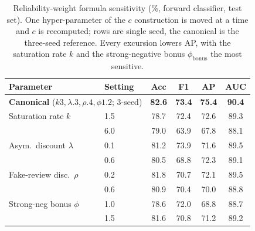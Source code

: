 \documentclass[11pt]{article}
\begin{document}
\begin{table}[h]
\centering\footnotesize
\setlength{\tabcolsep}{6pt}
\begin{tabular}{llcccc}
\toprule
\textbf{Parameter} & \textbf{Setting} & \textbf{Acc} & \textbf{F1} & \textbf{AP} & \textbf{AUC} \\
\midrule
\multicolumn{2}{l}{\textbf{Canonical} ($k3,\lambda.3,\rho.4,\phi1.2$; 3-seed)} & \textbf{82.6} & \textbf{73.4} & \textbf{75.4} & \textbf{90.4} \\
\midrule
Saturation rate $k$        & 1.5 & 78.7 & 72.4 & 72.6 & 89.3 \\
                           & 6.0 & 79.0 & 63.9 & 67.8 & 88.1 \\
Asym.\ discount $\lambda$  & 0.1 & 81.2 & 73.9 & 71.6 & 89.5 \\
                           & 0.6 & 80.5 & 68.8 & 72.3 & 89.1 \\
Fake-review disc.\ $\rho$  & 0.2 & 81.8 & 70.7 & 72.1 & 89.5 \\
                           & 0.6 & 80.9 & 70.4 & 70.0 & 88.8 \\
Strong-neg bonus $\phi$    & 1.0 & 78.6 & 72.0 & 68.8 & 88.7 \\
                           & 1.5 & 81.6 & 70.8 & 71.2 & 89.2 \\
\bottomrule
\end{tabular}
\caption{Reliability-weight formula sensitivity (\%, forward classifier, test
set). One hyper-parameter of the $c$ construction is moved at a time and $c$ is
recomputed; rows are single seed, the canonical is the three-seed reference.
Every excursion lowers AP, with the saturation rate $k$ and the strong-negative
bonus $\phi_{\mathrm{bonus}}$ the most sensitive.}
\label{tab:cform}
\end{table}
\end{document}
